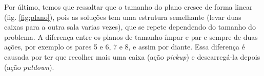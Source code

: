 \documentclass[12pt,a4paper]{article}
\begin{document}
Por último, temos que ressaltar que o tamanho do plano cresce de forma linear (fig. \ref{fig:plano}), pois as soluções tem uma estrutura semelhante (levar duas caixas para a outra sala varias vezes), que se repete dependendo do tamanho do problema. A diferença entre os planos de tamanho ímpar e par e sempre de duas ações, por exemplo os pares 5 e 6, 7 e 8, e assim por diante. 
Essa diferença é causada por ter que recolher mais uma caixa (ação \textit{pickup}) e descarregá-la depois (ação \textit{putdown}). 


\end{document}
